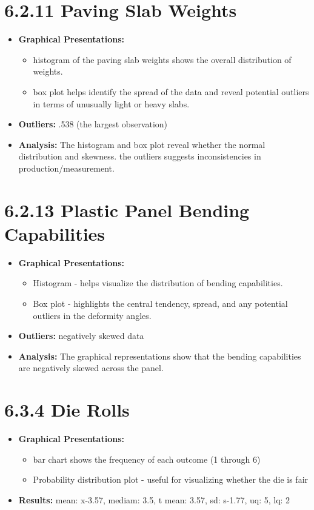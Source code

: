 \documentclass{article}
\begin{document}
\section*{6.2.11 Paving Slab Weights}
\begin{itemize}
    \item \textbf{Graphical Presentations:} 
    \begin{itemize}
        \item histogram of the paving slab weights shows the overall distribution of weights.
        \item  box plot helps identify the spread of the data and reveal potential outliers in terms of unusually light or heavy slabs.
    \end{itemize}
    \item \textbf{Outliers:} .538 (the largest observation)
    \item \textbf{Analysis:} The histogram and box plot reveal whether the normal distribution and skewness. the outliers suggests inconsistencies in production/measurement.
\end{itemize}

\section*{6.2.13 Plastic Panel Bending Capabilities}
\begin{itemize}
    \item \textbf{Graphical Presentations:} 
    \begin{itemize}
        \item Histogram  - helps visualize the distribution of bending capabilities.
        \item Box plot - highlights the central tendency, spread, and any potential outliers in the deformity angles.
    \end{itemize}
    \item \textbf{Outliers:} negatively skewed data
    \item \textbf{Analysis:} The graphical representations show that the bending capabilities are negatively skewed across the panel. 
\end{itemize}

\section*{6.3.4 Die Rolls}
\begin{itemize}
    \item \textbf{Graphical Presentations:} 
    \begin{itemize}
        \item bar chart shows the frequency of each outcome (1 through 6)
        \item Probability distribution plot  - useful for visualizing whether the die is fair
    \end{itemize}
    \item \textbf{Results:} mean: x-3.57, mediam: 3.5, t mean: 3.57, sd: s-1.77, uq: 5, lq: 2
\end{itemize}
\end{document}
